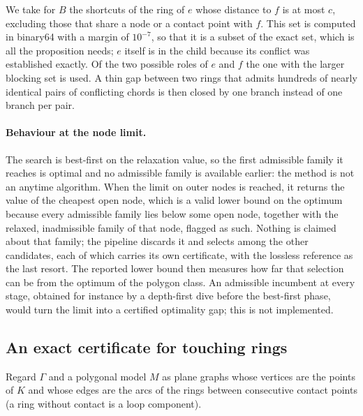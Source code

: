 \documentclass[11pt,a4paper]{article}
\theoremstyle{definition}
\theoremstyle{remark}
\begin{document}
We take for $B$ the shortcuts of the ring of $e$ whose distance to $f$ is at
most $c$, excluding those that share a node or a contact point with $f$. This
set is computed in binary64 with a margin of $10^{-7}$, so that it is a subset
of the exact set, which is all the proposition needs; $e$ itself is in the
child because its conflict was established exactly. Of the two possible
roles of $e$ and $f$ the one with the larger blocking set is used. A thin gap
between two rings that admits hundreds of nearly identical pairs of
conflicting chords is then closed by one branch instead of one branch per
pair.

\paragraph{Behaviour at the node limit.} The search is best-first on the
relaxation value, so the first admissible family it reaches is optimal and no
admissible family is available earlier: the method is not an anytime
algorithm. When the limit on outer nodes is reached, it returns the value of
the cheapest open node, which is a valid lower bound on the optimum because
every admissible family lies below some open node, together with the
relaxed, inadmissible family of that node, flagged as such. Nothing is
claimed about that family; the pipeline discards it and selects among the
other candidates, each of which carries its own certificate, with the
lossless reference as the last resort. The reported lower bound then measures
how far that selection can be from the optimum of the polygon class. An
admissible incumbent at every stage, obtained for instance by a depth-first
dive before the best-first phase, would turn the limit into a certified
optimality gap; this is not implemented.

\subsection{An exact certificate for touching rings}

Regard $\Gamma$ and a polygonal model $M$ as plane graphs whose vertices are
the points of $K$ and whose edges are the arcs of the rings between
consecutive contact points (a ring without contact is a loop component).
\end{document}
